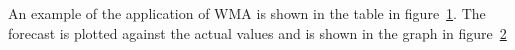 An example of the application of WMA is shown in the table in figure~\ref{fig:wmaTable}. The forecast is plotted against the actual values and is shown in the graph in figure~\ref{fig:wmaGraph}

\begin{figure}[ht]
	\caption{}
	\label{fig:wmaTable}
\end{figure}

\begin{figure}[ht]
	\caption{}
	\label{fig:wmaGraph}
\end{figure}

\FloatBarrier
